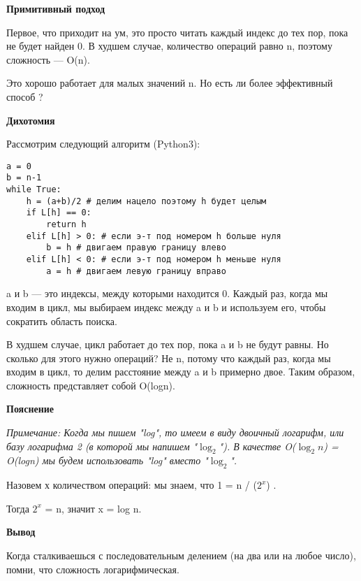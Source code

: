 \vspace{\baselineskip}
\textbf{Примитивный подход}

\vspace{\baselineskip}
Первое, что приходит на ум, это просто читать каждый индекс до тех пор, пока не будет найден 0. В худшем случае, количество операций равно n, поэтому сложность --- O(n). 

\vspace{\baselineskip}
Это хорошо работает для малых значений n. Но есть ли более эффективный способ ?

\vspace{\baselineskip}
\textbf{Дихотомия}

\vspace{\baselineskip}
Рассмотрим следующий алгоритм (Python3):

\vspace{\baselineskip}
\begin{tcolorbox}
\begin{verbatim}
a = 0
b = n-1
while True:
	h = (a+b)/2 # делим нацело поэтому h будет целым
	if L[h] == 0:
		return h
	elif L[h] > 0: # если э-т под номером h больше нуля
		b = h # двигаем правую границу влево
	elif L[h] < 0: # если э-т под номером h меньше нуля
		a = h # двигаем левую границу вправо
\end{verbatim}
\end{tcolorbox}


a и b --- это индексы, между которыми находится 0. Каждый раз, когда мы входим в цикл, мы выбираем индекс между a и b и используем его, чтобы сократить область поиска. 

\vspace{\baselineskip}
В худшем случае, цикл работает до тех пор, пока a и b не будут равны. Но сколько для этого нужно операций? Не n, потому что каждый раз, когда мы входим в цикл, то делим расстояние между a и b примерно двое. Таким образом, сложность представляет собой O(logn).

\vspace{\baselineskip}
\textbf{Пояснение}

\vspace{\baselineskip}
\textit{Примечание: Когда мы пишем "log", то имеем в виду двоичный логарифм, или базу логарифма 2 (в которой мы напишем "$\log_{2}$"). В качестве O($\log_{2}{n}$) = O(logn)  мы будем использовать "log" вместо "$\log_{2}$".}

\vspace{\baselineskip}
Назовем х количеством операций: мы знаем, что 1 = n / ($2^{x}$) . 

\vspace{\baselineskip}
Тогда $2^{x}$ = n,  значит x = log n.

\vspace{\baselineskip}
\textbf{Вывод}

\vspace{\baselineskip}
Когда сталкиваешься с последовательным делением (на два или на любое число), помни, что сложность логарифмическая.

